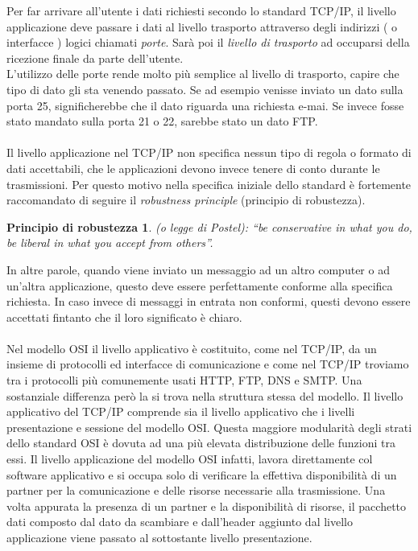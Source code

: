 \documentclass[a4paper, 11pt, oneside]{book}
\theoremstyle{plain}
\begin{document}
Per far arrivare all'utente i dati richiesti secondo lo standard TCP/IP, il livello applicazione deve passare i dati al livello trasporto attraverso degli indirizzi ( o interfacce ) logici chiamati \textit{porte}. Sarà poi il\textit{ livello di trasporto} ad occuparsi della ricezione finale da parte dell'utente.\\
L'utilizzo delle porte rende molto più semplice al livello di trasporto, capire che tipo di dato gli sta venendo passato. Se ad esempio venisse inviato un dato sulla porta 25, significherebbe che il dato riguarda una richiesta e-mai. Se invece fosse stato mandato sulla porta 21 o 22, sarebbe stato un dato FTP.\\\\ 
Il livello applicazione nel TCP/IP non specifica nessun tipo di regola o formato di dati accettabili, che le applicazioni devono invece tenere di conto durante le trasmissioni. Per questo motivo nella specifica iniziale dello standard è fortemente raccomandato di seguire il \textit{robustness principle }(principio di robustezza). \\

\newtheorem*{theorem*}{Principio di robustezza}
\begin{theorem*}
(o legge di Postel): “be conservative in what you do, be liberal in what you accept from others”.
 \end{theorem*} 
 In altre parole, quando viene inviato un messaggio 			ad un altro computer o ad un'altra applicazione, questo deve essere perfettamente conforme alla specifica richiesta. In caso invece di messaggi in entrata non conformi, questi devono essere accettati fintanto che il loro significato è chiaro.\\\\
Nel modello OSI il livello applicativo è costituito, come nel TCP/IP, da un insieme di protocolli ed interfacce di comunicazione e come  nel 	TCP/IP troviamo tra i protocolli più comunemente usati HTTP, FTP, DNS e SMTP. Una sostanziale differenza però la si trova nella struttura stessa del modello. Il livello applicativo del TCP/IP comprende sia il livello applicativo che i livelli presentazione e sessione del modello OSI. Questa maggiore modularità degli strati dello standard OSI è dovuta ad una più elevata distribuzione delle funzioni tra essi. Il livello applicazione del modello OSI infatti, lavora direttamente col software applicativo e si occupa solo di verificare la effettiva disponibilità di un partner per la comunicazione e delle risorse necessarie alla trasmissione. Una volta appurata la presenza di un partner e la disponibilità di risorse, il pacchetto dati composto dal dato da scambiare e dall'header aggiunto dal livello applicazione viene passato al sottostante livello presentazione.
\end{document}
